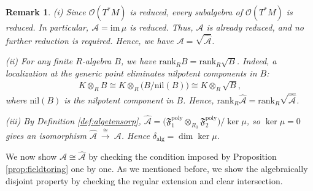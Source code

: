 \documentclass[11pt]{amsart}
\theoremstyle{definition}
\theoremstyle{plain}
\newtheorem{remark}[theorem]{Remark}
\theoremstyle{conclusion}
\begin{document}
\begin{remark}
\label{re:35}
 (i)  Since $\mathcal{O}(T^*M)$ is reduced, every subalgebra of $\mathcal{O}(T^*M)$ is reduced. In particular,  $ 
\mathcal{A}=\mathrm{im}\,\mu  $ is reduced. Thus, $\mathcal{A}$ is already reduced, and no further reduction is required. Hence, we have $\mathcal{A} = \sqrt{\widehat{\mathcal{A}}}$.

(ii) For any finite $R$-algebra $B$, we have $\mathrm{rank}_RB=\mathrm{rank}_R\sqrt{B}$. Indeed, a localization at the generic point eliminates nilpotent components in $B$: \begin{align*}
K\otimes_RB  \cong K\otimes_R\bigl(B/\mathrm{nil}(B)\bigr)  \cong K\otimes_R\sqrt{B},
\end{align*} where $\mathrm{nil}(B)$ is the nilpotent component in $B$. Hence, $\mathrm{rank}_R\widehat{\mathcal{A}}=\mathrm{rank}_R\sqrt{\widehat{\mathcal{A}}}$.

(iii) By Definition \ref{def:algetensorp}, $\widehat{\mathcal{A}}=\bigl(\mathfrak{F}_1^{\mathrm{poly}}\otimes_{R_0}\mathfrak{F}_2^{\mathrm{poly}}\bigr) /\ker\mu$, so $\ker\mu=0$ gives an isomorphism $\widehat{\mathcal{A}}\ \xrightarrow{\cong }\ \mathcal{A}$. Hence $\delta_{\mathrm{alg}} = \dim \ker \mu$.

\end{remark}


We now show $\mathcal{A} \cong \widehat{\mathcal{A}}$ by checking the condition imposed by Proposition \ref{prop:fieldtoring} one by one. As we mentioned before, we show the algebraically disjoint property by checking the regular extension and clear intersection. %
\end{document}
